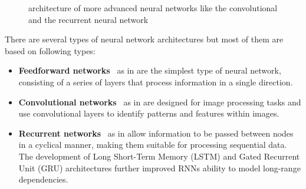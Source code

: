 \begin{figure}
    \begin{center}
        \hfill
    \end{center}
    \caption[advanced neural network architectures]{architecture of more advanced neural networks like the convolutional and the recurrent neural network}
    \label{fig:neural_network-architecture}
\end{figure}

There are several types of neural network architectures but most of them are based on following types: 
\begin{itemize}
	\item \textbf{Feedforward networks}~\cite{DL_FeedForward} as in  are the simplest type of neural network, consisting of a series of layers that process information in a single direction.
	\item \textbf{Convolutional networks}~\cite{DL_ConvNetwork} as in  are designed for image processing tasks and use convolutional layers to identify patterns and features within images. 
	\item \textbf{Recurrent networks}~\cite{DL_RecurrentNetwork} as in allow information to be passed between nodes in a cyclical manner, making them suitable for processing sequential data. The development of Long Short-Term Memory (LSTM) and Gated Recurrent Unit (GRU) architectures further improved RNNs ability to model long-range dependencies.
\end{itemize}

